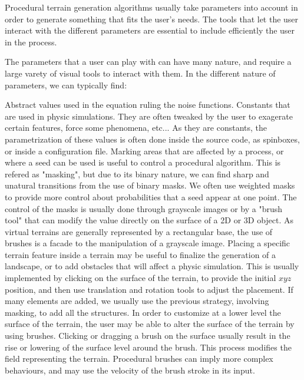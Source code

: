 Procedural terrain generation algorithms usually take parameters into account in order to generate something that fits the user's needs. The tools that let the user interact with the different parameters are essential to include efficiently the user in the process. 

The parameters that a user can play with can have many nature, and require a large varety of visual tools to interact with them. In the different nature of parameters, we can typically find: 
\begin{Itemize}
     Abstract values used in the equation ruling the noise functions. 
     Constants that are used in physic simulations. They are often tweaked by the user to exagerate certain features, force some phenomena, etc... As they are constants, the parametrization of these values is often done inside the source code, as spinboxes, or inside a configuration file. 
     Marking areas that are affected by a process, or where a seed can be used is useful to control a procedural algorithm. This is refered as "masking", but due to its binary nature, we can find sharp and unatural transitions from the use of binary masks. We often use weighted masks to provide more control about probabilities that a seed appear at one point. The control of the masks is usually done through grayscale images or by a "brush tool" that can modify the value directly on the surface of a 2D or 3D object. As virtual terrains are generally represented by a rectangular base, the use of brushes is a facade to the manipulation of a grayscale image.
     Placing a specific terrain feature inside a terrain may be useful to finalize the generation of a landscape, or to add obstacles that will affect a physic simulation. This is usually implemented by clicking on the surface of the terrain, to provide the initial $xyz$ position, and then use translation and rotation tools to adjust the placement. If many elements are added, we usually use the previous strategy, involving masking, to add all the structures.
     In order to customize at a lower level the surface of the terrain, the user may be able to alter the surface of the terrain by using brushes. Clicking or dragging a brush on the surface usually result in the rise or lowering of the surface level around the brush. This process modifies the field representing the terrain. Procedural brushes can imply more complex behaviours, and may use the velocity of the brush stroke in its input.
\end{Itemize}

